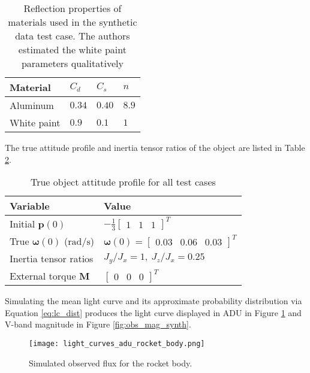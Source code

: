 \documentclass[a4paper,twocolumn]{spaceDebrisC} %
\newcommand{\vctr}[1]{\bm{#1}}
\newcommand{\figsmall}[0]{0.3\textwidth}
\begin{document}
\begin{table}[H]
  \centering
  \caption{Reflection properties of materials used in the synthetic data test case. The authors estimated the white paint parameters qualitatively}
  \vspace*{6pt}
  \begin{tabular}{|l|l|l|l|}
  \hline
  \textbf{Material} & $C_d$ & $C_s$ & $n$ \\ \hline
  Aluminum \cite{fankhauser2023} & $0.34$ & $0.40$ & $8.9$ \\ \hline
  White paint & $0.9$ & $0.1$ & $1$ \\ \hline
  \end{tabular}
  \label{tb:synth_matprops}
\end{table}

The true attitude profile and inertia tensor ratios of the object are listed in Table \ref{tb:synth_att}.

\begin{table}[H]
  \centering
  \caption{True object attitude profile for all test cases}
  \vspace*{6pt}
  \begin{tabular}{|l|l|}
  \hline
  \textbf{Variable} & \textbf{Value} \\ \hline
 Initial $\vctr{p}(0)$ & $-\frac{1}{3} \begin{bmatrix} 1 & 1 & 1 \end{bmatrix}^T$ \\ \hline
 True $\vctr{\omega}(0)$ ($\text{rad}/\text{s}$) & $\vctr{\omega}(0) = \begin{bmatrix} 0.03 & 0.06 & 0.03 \end{bmatrix}^T$ \\ \hline
 Inertia tensor ratios & $J_y / J_x = 1, \: J_z / J_x = 0.25$ \\ \hline
 External torque $\vctr{M}$ & $\begin{bmatrix} 0 & 0 & 0 \end{bmatrix}^T$ \\ \hline
  \end{tabular}
  \label{tb:synth_att}
\end{table}
\FloatBarrier

Simulating the mean light curve and its approximate probability distribution via Equation \ref{eq:lc_dist} produces the light curve displayed in ADU in Figure \ref{fig:obs_adu_synth} and V-band magnitude in Figure \ref{fig:obs_mag_synth}.

\begin{figure}[H]
  \centering
  \texttt{[image: light\_curves\_adu\_rocket\_body.png]}
  \caption{Simulated observed flux for the rocket body.}
  \label{fig:obs_adu_synth}
\end{figure}
\end{document}
